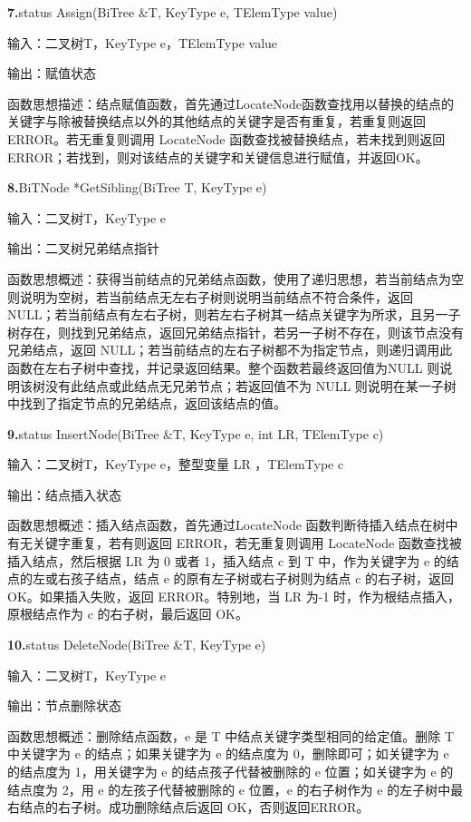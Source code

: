 \documentclass[supercite]{Experimental_Report}
\theoremstyle{definition}
\begin{document}
\noindent\textbf{ 7.}status Assign(BiTree \&T, KeyType e, TElemType value)

输入：二叉树T，KeyType e，TElemType value

输出：赋值状态

函数思想描述：结点赋值函数，首先通过LocateNode函数查找用以替换的结点的关键字与除被替换结点以外的其他结点的关键字是否有重复，若重复则返回 ERROR。若无重复则调用 LocateNode 函数查找被替换结点，若未找到则返回 ERROR；若找到，则对该结点的关键字和关键信息进行赋值，并返回OK。

\noindent\textbf{ 8.}BiTNode *GetSibling(BiTree T, KeyType e)

输入：二叉树T，KeyType e

输出：二叉树兄弟结点指针

函数思想概述：获得当前结点的兄弟结点函数，使用了递归思想，若当前结点为空则说明为空树，若当前结点无左右子树则说明当前结点不符合条件，返回 NULL；若当前结点有左右子树，则若左右子树其一结点关键字为所求，且另一子树存在，则找到兄弟结点，返回兄弟结点指针，若另一子树不存在，则该节点没有兄弟结点，返回 NULL；若当前结点的左右子树都不为指定节点，则递归调用此函数在左右子树中查找，并记录返回结果。整个函数若最终返回值为NULL 则说明该树没有此结点或此结点无兄弟节点；若返回值不为 NULL 则说明在某一子树中找到了指定节点的兄弟结点，返回该结点的值。

\noindent\textbf{ 9.}status InsertNode(BiTree \&T, KeyType e, int LR, TElemType c)

输入：二叉树T，KeyType e，整型变量 LR ，TElemType c

输出：结点插入状态

函数思想概述：插入结点函数，首先通过LocateNode 函数判断待插入结点在树中有无关键字重复，若有则返回 ERROR，若无重复则调用 LocateNode 函数查找被插入结点，然后根据 LR 为 0 或者 1，插入结点 c 到 T 中，作为关键字为 e 的结点的左或右孩子结点，结点 e 的原有左子树或右子树则为结点 c 的右子树，返回 OK。如果插入失败，返回 ERROR。特别地，当 LR 为-1 时，作为根结点插入，原根结点作为 c 的右子树，最后返回 OK。

\noindent\textbf{10.}status DeleteNode(BiTree \&T, KeyType e)

输入：二叉树T，KeyType e

输出：节点删除状态

函数思想概述：删除结点函数，e 是 T 中结点关键字类型相同的给定值。删除 T 中关键字为 e 的结点；如果关键字为 e 的结点度为 0，删除即可；如关键字为 e 的结点度为 1，用关键字为 e 的结点孩子代替被删除的 e 位置；如关键字为 e 的结点度为 2，用 e 的左孩子代替被删除的 e 位置，e 的右子树作为 e 的左子树中最右结点的右子树。成功删除结点后返回 OK，否则返回ERROR。
\end{document}

